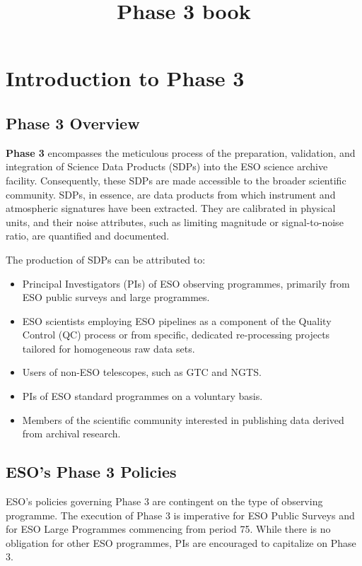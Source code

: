 \documentclass[a4paper,10pt]{book}
\title{Phase 3 book}
\begin{document}
\maketitle
\tableofcontents





\chapter{Introduction to Phase 3}

\section{Phase 3 Overview}

\textbf{Phase 3} encompasses the meticulous process of the preparation, validation, and integration of Science Data Products (SDPs) into the ESO science archive facility. Consequently, these SDPs are made accessible to the broader scientific community. SDPs, in essence, are data products from which instrument and atmospheric signatures have been extracted. They are calibrated in physical units, and their noise attributes, such as limiting magnitude or signal-to-noise ratio, are quantified and documented.

The production of SDPs can be attributed to:

\begin{itemize}
    \item Principal Investigators (PIs) of ESO observing programmes, primarily from ESO public surveys and large programmes.
    \item ESO scientists employing ESO pipelines as a component of the Quality Control (QC) process or from specific, dedicated re-processing projects tailored for homogeneous raw data sets.
    \item Users of non-ESO telescopes, such as GTC and NGTS.
    \item PIs of ESO standard programmes on a voluntary basis.
    \item Members of the scientific community interested in publishing data derived from archival research.
\end{itemize}

\section{ESO’s Phase 3 Policies}

ESO’s policies governing Phase 3 are contingent on the type of observing programme. The execution of Phase 3 is imperative for ESO Public Surveys and for ESO Large Programmes commencing from period 75. While there is no obligation for other ESO programmes, PIs are encouraged to capitalize on Phase 3.
\end{document}
